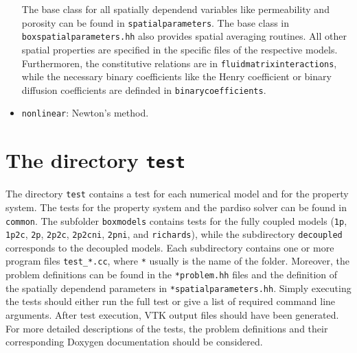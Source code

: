 \begin{itemize}
The base class for all spatially dependend variables like permeability and porosity can be found in \texttt{spatialparameters}. The base class in \texttt{boxspatialparameters.hh} also provides spatial averaging routines. All other spatial properties are specified in the specific files of the respective models. Furthermoren, the constitutive relations are in \texttt{fluidmatrixinteractions}, while the necessary binary coefficients like the Henry coefficient or binary diffusion coefficients are definded in \texttt{binarycoefficients}.


\item \texttt{nonlinear}: Newton's method.


% 
% 
% 
% 
% 
% 
% 
% 


\end{itemize}



\section{The directory \texttt{test}}\label{sec:test}


The directory \texttt{test} contains a test for each numerical model and for 
the property system. The tests for the property system and the pardiso solver can be found in \texttt{common}. 
The subfolder \texttt{boxmodels} contains tests for the fully 
coupled models (\texttt{1p},  \texttt{1p2c},  \texttt{2p},  \texttt{2p2c},  
\texttt{2p2cni},  \texttt{2pni},  and \texttt{richards}), while the subdirectory \texttt{decoupled} corresponds to the decoupled models. 
Each subdirectory contains one or more program files \texttt{test\_*.cc}, where \texttt{*} usually is the 
name of the folder. Moreover, the problem definitions can be found 
in the \texttt{*problem.hh} files and the definition of the spatially dependend parameters in \texttt{*spatialparameters.hh}. Simply executing the tests should either run the 
full test or give a list of required command line arguments. After test execution, 
VTK output files should have been generated. 
For more detailed descriptions of the tests, the problem definitions and their corresponding 
Doxygen documentation should be considered. 

